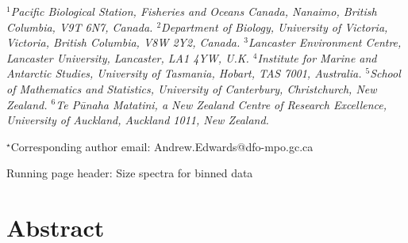 \documentclass[12pt, letter]{article}
\begin{document}
\medskip

{\it
\noindent $^1$Pacific Biological Station, Fisheries and Oceans Canada,
  Nanaimo, British Columbia, V9T 6N7, Canada. %
\noindent $^2$Department
  of Biology, University of Victoria, Victoria, British
  Columbia, V8W 2Y2, Canada. %
\noindent $^3$Lancaster Environment Centre, Lancaster University, Lancaster,
  LA1 4YW, U.K.
\noindent $^4$Institute for Marine and Antarctic Studies,
  University of Tasmania, Hobart, TAS 7001, Australia. %
\noindent $^5$School of Mathematics and Statistics, University of Canterbury,
  Christchurch, New Zealand.
\noindent $^6$Te P\={u}naha Matatini, a New Zealand Centre of
  Research Excellence, University of Auckland, Auckland 1011, New Zealand.}

\medskip

\noindent $^\star$Corresponding author email: Andrew.Edwards@dfo-mpo.gc.ca


\medskip


\medskip

\noindent Running page header: Size spectra for binned data %

\medskip

\section*{Abstract}
\end{document}
